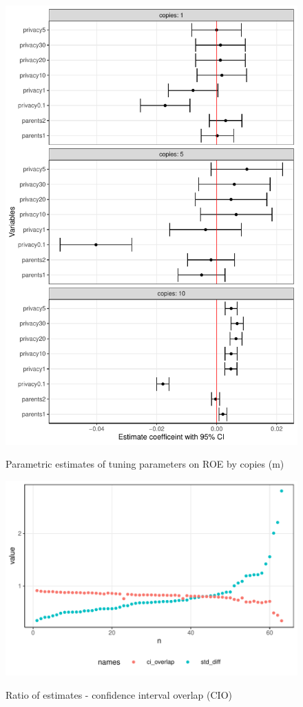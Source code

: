 \documentclass[12pt]{article}
\begin{document}
\begin{figure}[!h]
    \centering
    \caption{Parametric estimates of tuning parameters on ROE by copies (m)}
    \includegraphics{../graphs/datasynthesizer/graph_datasynthesizer_roc_univar_facet.pdf}
    \label{graph_datasynthesizer_roc_univar_facet}
\end{figure}

\begin{figure}[!h]
    \centering
    \caption{Ratio of estimates - confidence interval overlap (CIO)}
    \includegraphics{../graphs/datasynthesizer/graph_datasynthesizer_cio_raw.pdf}
    \label{graph_datasynthesizer_cio}
\end{figure}
\end{document}
